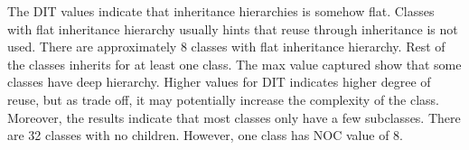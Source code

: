 \begin{table}[]
\end{table}

The DIT values indicate that inheritance hierarchies is somehow flat. Classes with flat inheritance hierarchy usually hints that reuse through inheritance is not used. There are approximately 8 classes with flat inheritance hierarchy. Rest of the classes inherits for at least one class. The max value captured show that some classes have deep hierarchy. Higher values for DIT indicates higher degree of reuse, but as trade off, it may potentially increase the complexity of the class. Moreover, the results indicate that most classes only have a few subclasses. There are 32 classes with no children. However, one class has NOC value of 8. 

